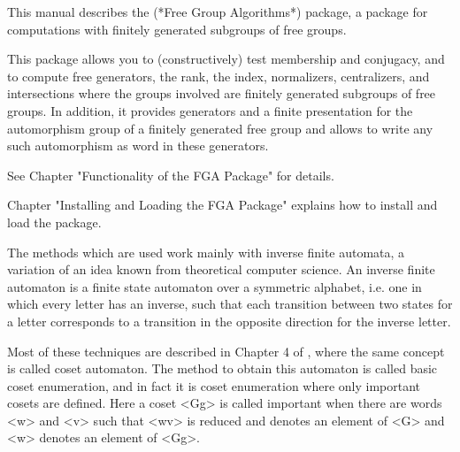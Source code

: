 



This manual describes the {\FGA} (*Free Group Algorithms*) package,
a {\GAP} package for computations with finitely generated subgroups of
free groups.

This package allows you to (constructively) test membership and
conjugacy, and to compute free generators, the rank, the index,
normalizers, centralizers, and intersections
where the groups involved are finitely generated subgroups of free groups.
%
In addition, it provides generators and a finite presentation for the
automorphism group of a finitely generated free group and allows to
write any such automorphism as word in these generators.

See Chapter "Functionality of the FGA Package" for details.

Chapter "Installing and Loading the FGA Package" explains
how to install and load the {\FGA} package.


The methods which are used work mainly with inverse finite automata,
a variation of an idea known from theoretical computer science.
An inverse finite automaton is a finite state automaton over a
symmetric alphabet, i.e. one in which every letter has an inverse,
such that each transition between two states for a letter corresponds
to a transition in the opposite direction for the inverse letter.

Most of these techniques are described in Chapter 4 of \cite{Sims94},
where the same concept is called coset automaton.
The method to obtain this automaton is called basic coset enumeration,
and in fact it is coset enumeration where only important cosets are
defined.  Here a coset <Gg> is called important when there
are words <w> and <v> such that <wv> is reduced and denotes an element
of <G> and <w> denotes an element of <Gg>.

